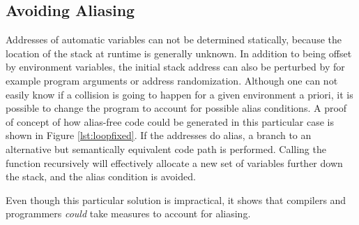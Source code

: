 \documentclass[10pt, conference, compsocconf]{IEEEtran}
\begin{document}
\subsection{Avoiding Aliasing}
Addresses of automatic variables can not be determined statically, because the location of the stack at runtime is generally unknown.
In addition to being offset by environment variables, the initial stack address can also be perturbed by for example program arguments or address randomization.
Although one can not easily know if a collision is going to happen for a given environment a priori, it is possible to change the program to account for possible alias conditions.
A proof of concept of how alias-free code could be generated in this particular case is shown in Figure \ref{lst:loopfixed}.
If the addresses do alias, a branch to an alternative but semantically equivalent code path is performed.
Calling the function recursively will effectively allocate a new set of variables further down the stack, and the alias condition is avoided.

Even though this particular solution is impractical, it shows that compilers and programmers \emph{could} take measures to account for aliasing.
\end{document}

